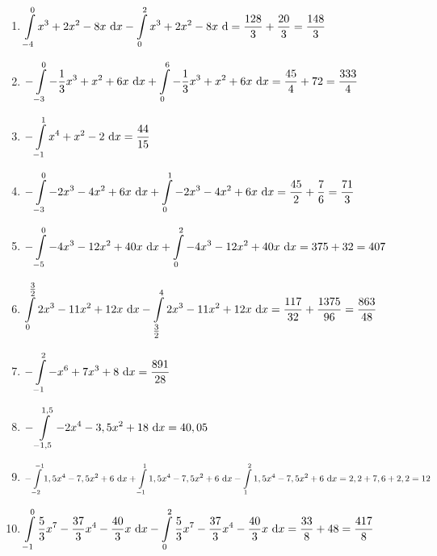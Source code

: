 \begin{Answer}[ref=flaecheRechnA1]
	\begin{enumerate}[label=\alph*)]
		\item \(\displaystyle\int\limits_{-4}^{0} x^3+2x^2-8x\ \text{d} x-\int\limits_{0}^{2} x^3+2x^2-8x\ \text{d}=\frac{128}{3}+\frac{20}{3}=\frac{148}{3}\)
		\item \(\displaystyle-\int\limits_{-3}^{0} -\frac{1}{3}x^3+x^2+6x\ \text{d} x+\int\limits_{0}^{6} -\frac{1}{3}x^3+x^2+6x\ \text{d} x=\frac{45}{4}+72=\frac{333}{4}\)
		\item \(\displaystyle-\int\limits_{-1}^{1} x^4+x^2-2\ \text{d} x=\frac{44}{15}\)
		\item \(\displaystyle-\int\limits_{-3}^{0} -2x^3-4x^2+6x\ \text{d} x+\int\limits_{0}^{1} -2x^3-4x^2+6x\ \text{d} x=\frac{45}{2}+\frac{7}{6}=\frac{71}{3}\)
		\item \(\displaystyle -\int\limits_{-5}^{0}-4x^3-12x^2+40x \ \text{d} x +\int\limits_{0}^{2}-4x^3-12x^2+40x \ \text{d} x=375+32=407\)
		\item \(\displaystyle \int\limits_{0}^{\tfrac{3}{2}} 2x^3-11x^2+12x \ \text{d} x - \int\limits_{\tfrac{3}{2}}^{4} 2x^3-11x^2+12x \ \text{d} x=\frac{117}{32}+\frac{1375}{96}=\frac{863}{48}\)
		\item \(\displaystyle -\int\limits_{-1}^{2} -x^6+7x^3+8 \ \text{d} x=\frac{891}{28}\)
		\item \(\displaystyle -\int\limits_{-1,5}^{1,5} -2x^4-3,5x^2+18 \ \text{d} x=40,05\)
		\item \(\displaystyle-\int\limits_{-2}^{-1} 1,5x^4-7,5x^2+6\ \text{d} x+\int\limits_{-1}^{1} 1,5x^4-7,5x^2+6\ \text{d} x-\int\limits_{1}^{2} 1,5x^4-7,5x^2+6\ \text{d} x=2,2+7,6+2,2=12\)
		\item \(\displaystyle \int\limits_{-1}^{0} \frac{5}{3}x^7-\frac{37}{3}x^4-\frac{40}{3}x \ \text{d} x-\int\limits_{0}^{2} \frac{5}{3}x^7-\frac{37}{3}x^4-\frac{40}{3}x \ \text{d} x=\frac{33}{8}+48=\frac{417}{8}\)
	\end{enumerate}
\end{Answer}
